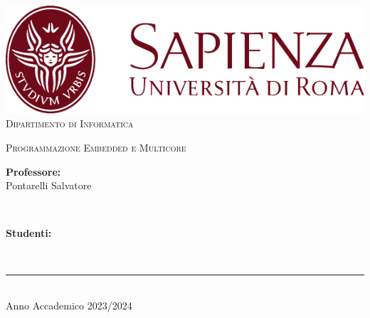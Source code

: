 \begin{titlepage}
	\centering
    \vspace*{0.5 cm}
    \includegraphics[scale = 0.75]{figures/SapienzaLogo.pdf}\\[1.0 cm]	%

    \vspace*{-0.4cm}
    \textsc{\large Dipartimento di Informatica}\\[2.0 cm]	%
    \vspace*{1cm}

    { \fontsize{20.74pt}{18.5pt}\selectfont\bfseries \thetitle \par } %

    \vspace*{0.25cm}
    \textsc{\Large Programmazione Embedded e Multicore}\\[0.5 cm] %

    \vspace*{3.6cm}
	\begin{minipage}{0.45\textwidth} %
		\begin{flushleft} \large
			\textbf{Professore:}\\
			Pontarelli Salvatore\\
		\end{flushleft}
	\end{minipage}~
	\begin{minipage}{0.45\textwidth} %
		\begin{flushright} \large
		\begin{minipage}{1\textwidth}
		\begin{flushleft} \large
			\textbf{Studenti:} \\
			\theauthor
        \end{flushleft}
        \end{minipage}
		\end{flushright}
	\end{minipage}\\[3.85 cm]

    \vspace{4cm}
    \rule{\linewidth}{0.2 mm} \\[0.3 cm]
    \vspace*{-0.2cm}
    Anno Accademico 2023/2024
\end{titlepage}